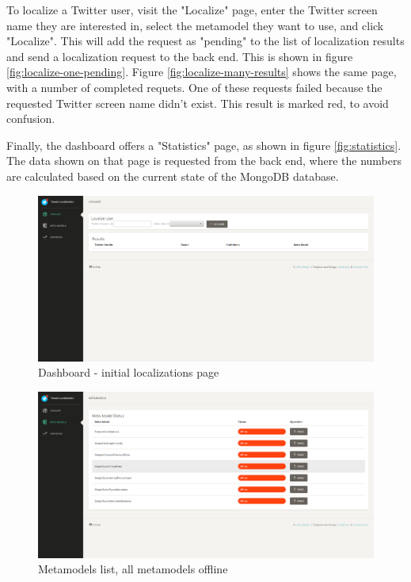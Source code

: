 \documentclass[10pt,a4paper]{article}
\begin{document}
To localize a Twitter user, visit the "Localize" page, enter the Twitter screen name they are interested in, select the metamodel they want to use, and click "Localize". This will add the request as "pending" to the list of localization results and send a localization request to the back end. This is shown in figure \ref{fig:localize-one-pending}. Figure \ref{fig:localize-many-results} shows the same page, with a number of completed requets. One of these requests failed because the requested Twitter screen name didn't exist. This result is marked red, to avoid confusion.

Finally, the dashboard offers a "Statistics" page, as shown in figure \ref{fig:statistics}. The data shown on that page is requested from the back end, where the numbers are calculated based on the current state of the MongoDB database.

\begin{figure}
	\centering
	\includegraphics[scale=0.20]{localize-initial}
	\caption{Dashboard - initial localizations page}
	\label{fig:localize-initial}
\end{figure}

\begin{figure}
	\centering
	\includegraphics[scale=0.20]{metamodels-initial}
	\caption{Metamodels list, all metamodels offline}
	\label{fig:metamodels-initial}
\end{figure}
\end{document}
